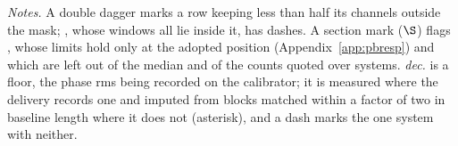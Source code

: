 \begin{table}
\centering
\caption{\textbf{Per-system sensitivity of the carrier search.} For each of
the \NSysClassA{} systems the fine-channel search covers, the
$\mathrm{EIRP}_{90}$ of its best window with its own primary-beam,
annual-parallax and smearing retentions applied, ordered by the limit.
Columns and daggers are defined in Appendix~\ref{app:persys}; the notes
below give the other marks.}
\label{tab:persys}
\footnotesize


{\footnotesize\raggedright \emph{Notes.} A double dagger marks a row
keeping less than half its channels outside the mask; \NSysALostName, whose
\UmNWinALostWin{} windows all lie inside it, has dashes. A section mark
($\S$) flags \OmFlagStars, whose limits hold only at the adopted position
(Appendix~\ref{app:pbresp}) and which are left out of the median and of
the counts quoted over systems.
\emph{dec.} is a floor, the phase rms being recorded on the calibrator; it
is measured where the delivery records one and imputed from blocks matched
within a factor of two in baseline length where it does not (asterisk), and
a dash marks the one system with neither.\par}
\end{table}
